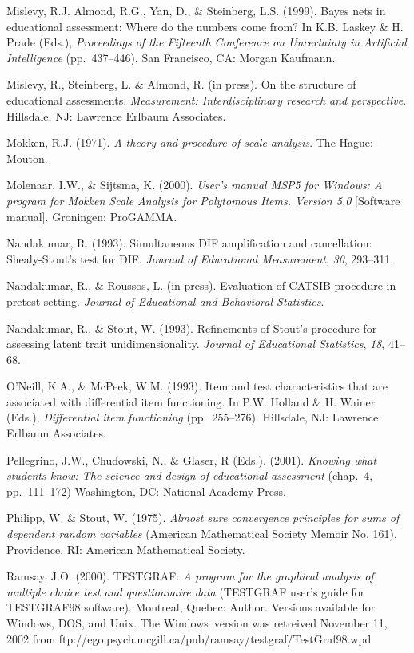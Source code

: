 \documentclass[titlepage,11pt,twoside]{article}
\begin{document}
\begin{thebibliography}
\bibitem Mislevy, R.J. Almond, R.G., Yan, D., \& Steinberg, L.S. (1999). Bayes nets in educational assessment: Where do the numbers come from? In K.B. Laskey \& H. Prade (Eds.), \textit{Proceedings of the Fifteenth Conference on Uncertainty in Artificial Intelligence} (pp.~437--446). San Francisco, CA: Morgan Kaufmann.

\bibitem Mislevy, R., Steinberg, L. \& Almond, R. (in press). On the structure of educational assessments. \textit{Measurement: Interdisciplinary research and perspective}. Hillsdale, NJ: Lawrence Erlbaum Associates.

\bibitem Mokken, R.J. (1971). \textit{A theory and procedure of scale analysis}. The Hague: Mouton.

\bibitem Molenaar, I.W., \& Sijtsma, K. (2000). \textit{User's manual MSP5 for Windows: A program for Mokken Scale Analysis for Polytomous Items. Version 5.0} [Software manual]. Groningen: ProGAMMA.

\bibitem Nandakumar, R. (1993). Simultaneous DIF amplification and cancellation: Shealy-Stout's test for DIF. \textit{Journal of Educational Measurement}, \textit{30}, 293--311.

\bibitem Nandakumar, R., \& Roussos, L. (in press). Evaluation of CATSIB procedure in pretest setting. \textit{Journal of Educational and Behavioral Statistics}.

\bibitem Nandakumar, R., \& Stout, W. (1993). Refinements of Stout's procedure for assessing latent trait unidimensionality. \textit{Journal of Educational Statistics}, \textit{18}, 41--68.

\bibitem O'Neill, K.A., \& McPeek, W.M. (1993). Item and test characteristics that are associated with differential item functioning. In P.W. Holland \& H. Wainer (Eds.), \textit{Differential item functioning} (pp.~255--276). Hillsdale, NJ: Lawrence Erlbaum Associates.

\bibitem Pellegrino, J.W., Chudowski, N., \& Glaser, R (Eds.). (2001). \textit{Knowing what students know: The science and design of educational assessment} (chap.~4, pp.~111--172) Washington, DC: National Academy Press.

\bibitem Philipp, W. \& Stout, W. (1975). \textit{Almost sure convergence principles for sums of dependent random variables} (American Mathematical Society Memoir No. 161). Providence, RI: American Mathematical Society.

\bibitem Ramsay, J.O. (2000). TESTGRAF: \textit{A program for the graphical analysis of multiple choice test and questionnaire data} (TESTGRAF user's guide for TESTGRAF98 software). Montreal, Quebec: Author. Versions available for Windows\textregistered, DOS, and Unix. The Windows\textregistered\ version was retreived November 11, 2002 from \mbox{ftp://ego.psych.mcgill.ca/pub/ramsay/testgraf/TestGraf98.wpd}


\end{thebibliography}
\end{document}
